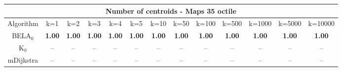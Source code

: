 \begin{tabular}{c|cccccccccccc}\toprule
\multicolumn{13}{c}{Number of centroids - Maps 35 octile}\\ \midrule
Algorithm & k=1 & k=2 & k=3 & k=4 & k=5 & k=10 & k=50 & k=100 & k=500 & k=1000 & k=5000 & k=10000 \\ \midrule
BELA$_0$ & \textbf{1.00} & \textbf{1.00} & \textbf{1.00} & \textbf{1.00} & \textbf{1.00} & \textbf{1.00} & \textbf{1.00} & \textbf{1.00} & \textbf{1.00} & \textbf{1.00} & \textbf{1.00} & \textbf{1.00} \\
K$_0$ & -- & -- & -- & -- & -- & -- & -- & -- & -- & -- & -- & -- \\
mDijkstra & -- & -- & -- & -- & -- & -- & -- & -- & -- & -- & -- & -- \\ \bottomrule 
\end{tabular}
